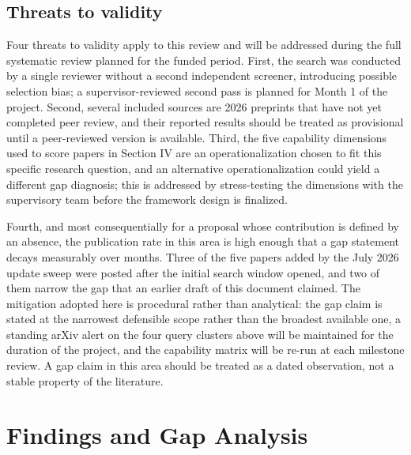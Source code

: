 \documentclass[10pt,twocolumn,letterpaper]{article}
\begin{document}
\subsection{Threats to validity}

Four threats to validity apply to this review and will be addressed during the full systematic review planned for the funded period. First, the search was conducted by a single reviewer without a second independent screener, introducing possible selection bias; a supervisor-reviewed second pass is planned for Month 1 of the project. Second, several included sources are 2026 preprints that have not yet completed peer review, and their reported results should be treated as provisional until a peer-reviewed version is available. Third, the five capability dimensions used to score papers in Section IV are an operationalization chosen to fit this specific research question, and an alternative operationalization could yield a different gap diagnosis; this is addressed by stress-testing the dimensions with the supervisory team before the framework design is finalized.

Fourth, and most consequentially for a proposal whose contribution is defined by an absence, the publication rate in this area is high enough that a gap statement decays measurably over months. Three of the five papers added by the July 2026 update sweep were posted after the initial search window opened, and two of them narrow the gap that an earlier draft of this document claimed. The mitigation adopted here is procedural rather than analytical: the gap claim is stated at the narrowest defensible scope rather than the broadest available one, a standing arXiv alert on the four query clusters above will be maintained for the duration of the project, and the capability matrix will be re-run at each milestone review. A gap claim in this area should be treated as a dated observation, not a stable property of the literature.

\section{Findings and Gap Analysis}
\end{document}
